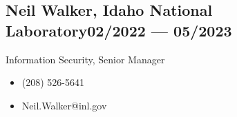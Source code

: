 \documentclass[letterpaper,11pt]{article}
\begin{document}
\subsection*{{\color{cvblue}Neil Walker,} Idaho National Laboratory\hfill 02/2022 --- 05/2023}
Information Security, Senior Manager
\begin{itemize}
    \setlength{\itemsep}{-.5pt}
    \item (208) 526-5641
    \item Neil.Walker@inl.gov
\end{itemize}
\end{document}
